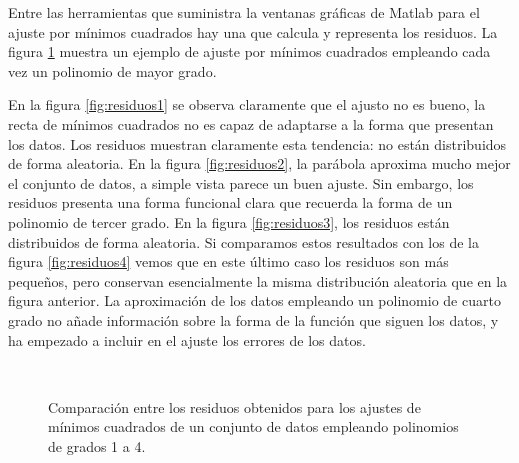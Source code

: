\begin{paracol}{2}
Entre las herramientas que suministra la ventanas gráficas de Matlab para el ajuste por mínimos cuadrados hay una que calcula y representa los residuos.  La figura \ref{fig:residuos} muestra un ejemplo de ajuste por mínimos cuadrados empleando cada vez un polinomio de mayor grado. 
  
  
En la figura \ref{fig:residuos1} se observa claramente que el ajusto no es bueno, la recta de mínimos cuadrados no es capaz de adaptarse a la forma que presentan los datos. Los residuos muestran claramente esta tendencia: no están distribuidos de forma aleatoria. En la figura \ref{fig:residuos2}, la parábola aproxima mucho mejor el conjunto de datos, a simple vista parece un buen ajuste. Sin embargo, los residuos presenta una forma funcional clara que recuerda la forma de un polinomio de tercer grado. En la figura \ref{fig:residuos3}, los residuos están distribuidos de forma aleatoria. Si comparamos estos resultados con los de la figura \ref{fig:residuos4} vemos que en este último caso los residuos son más pequeños, pero conservan esencialmente la misma distribución aleatoria que en la figura anterior. La aproximación de los datos empleando un polinomio de cuarto grado no añade información sobre la forma de la función que siguen los datos, y ha empezado a incluir en el ajuste los errores de los datos. 
\end{paracol}
\begin{figure}[h]
\centering
{} \qquad 
{}\\
 \qquad 
{}
\caption{Comparación entre los residuos obtenidos para los ajustes de mínimos cuadrados de un conjunto de datos empleando polinomios de grados 1 a 4.} 
\label{fig:residuos}
\end{figure}
